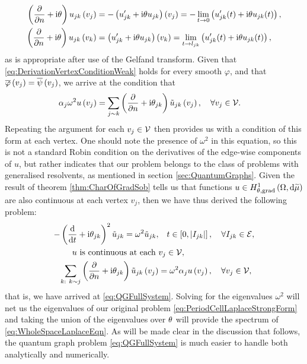 \begin{align*}
	\left( \dfrac{\partial }{\partial n}+ \mathrm{i}\theta \right)u_{jk}\left( v_j \right) &= -\left( u_{jk}' + \mathrm{i}\theta u_{jk} \right)\left( v_j \right) = -\lim_{t\rightarrow0} \left(  u_{jk}'(t)+\mathrm{i}\theta u_{jk}(t)  \right), \\
	\left( \dfrac{\partial }{\partial n}+ \mathrm{i}\theta \right)u_{jk}\left( v_k \right) &= \left( u_{jk}' + \mathrm{i}\theta u_{jk} \right)\left( v_k \right) = \lim_{t\rightarrow l_{jk}} \left(  u_{jk}'(t)+\mathrm{i}\theta u_{jk}(t)  \right),
\end{align*}
as is appropriate after use of the Gelfand transform.
Given that \eqref{eq:DerivationVertexConditionWeak} holds for every smooth $\varphi$, and that $\overline{\varphi}\left( v_j \right)=\overline{\psi}\left( v_j \right)$, we arrive at the condition that
\begin{align*}
	\alpha_j\omega^2 u\left( v_j \right) &= \sum_{j\sim k}\left( \dfrac{\partial }{\partial n} + \mathrm{i}\theta_{jk} \right)\tilde{u}_{jk}\left( v_j \right), \quad \forall v_j \in \mathcal{V}.
\end{align*}
Repeating the argument for each $v_j\in \mathcal{V}$ then provides us with a condition of this form at each vertex.
One should note the presence of $\omega^2$ in this equation, so this is not a standard Robin condition on the derivatives of the edge-wise components of $u$, but rather indicates that our problem belongs to the class of problems with generalised resolvents, as mentioned in section \ref{sec:QuantumGraphs}.
Given the result of theorem \ref{thm:CharOfGradSob} tells us that functions $u\in H^1_{\theta, \mathrm{grad}}\left( \Omega, \mathrm{d}\widetilde{\mu} \right)$ are also continuous at each vertex $v_j$, then we have thus derived the following problem:
\begin{align*}
	-\left( \dfrac{\mathrm{d}}{\mathrm{d}t} + \mathrm{i}\theta_{jk} \right)^2 \tilde{u}_{jk} = \omega^2 \tilde{u}_{jk}, &\quad t\in\left[ 0,\left\lvert I_{jk} \right\rvert \right], \quad \forall I_{jk}\in \mathcal{E}, \\
	u \text{ is continuous at each } &v_j \in \mathcal{V}, \\
	\sum_{k: \ k\sim j}\left( \dfrac{\partial }{\partial n} + \mathrm{i}\theta_{jk} \right)\tilde{u}_{jk}\left( v_j \right) &= \omega^2\alpha_{j}u\left( v_j \right),  \quad \forall v_j \in \mathcal{V},
\end{align*}
that is, we have arrived at \eqref{eq:QGFullSystem}.
Solving for the eigenvalues $\omega^2$ will net us the eigenvalues of our original problem \eqref{eq:PeriodCellLaplaceStrongForm} and taking the union of the eigenvalues over $\theta$ will provide the spectrum of \eqref{eq:WholeSpaceLaplaceEqn}.
As will be made clear in the discussion that follows, the quantum graph problem \eqref{eq:QGFullSystem} is much easier to handle both analytically and numerically.